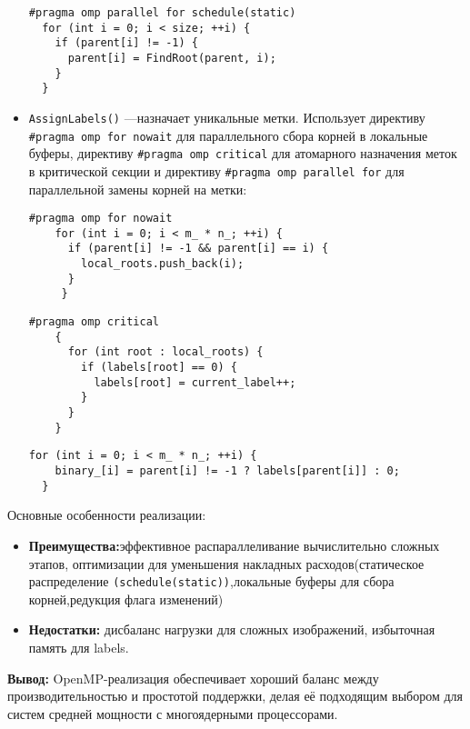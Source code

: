 \documentclass[12pt]{extarticle}
\begin{document}
\begin{itemize}
    \begin{lstlisting}[caption={Параллельное обновление родительских ссылок в методе FinalizeRoots},label={all}]
#pragma omp parallel for schedule(static)
  for (int i = 0; i < size; ++i) {
    if (parent[i] != -1) {
      parent[i] = FindRoot(parent, i);
    }
  }
  \end{lstlisting}
  \item \texttt{AssignLabels()} —назначает уникальные метки. Использует директиву \texttt{\#pragma omp for nowait} для параллельного сбора корней в локальные буферы, директиву \texttt{\#pragma omp critical} для атомарного назначения меток в критической секции и директиву \texttt{\#pragma omp parallel for} для параллельной замены корней на метки:

    \begin{lstlisting}[caption={Параллельный сбор корней в локальные буферы в методе AssignLabels},label={all}]
    #pragma omp for nowait
    for (int i = 0; i < m_ * n_; ++i) {
      if (parent[i] != -1 && parent[i] == i) {
        local_roots.push_back(i);
      }
     } 
  \end{lstlisting}
   \begin{lstlisting}[caption={Атомарное назначение меток в критической секции в методе AssignLabels},label={all}]
    #pragma omp critical
    {
      for (int root : local_roots) {
        if (labels[root] == 0) {
          labels[root] = current_label++;
        }
      }
    }
  \end{lstlisting}
  \begin{lstlisting}[caption={Параллельная замена корней на метки в методе AssignLabels},label={all}]
    for (int i = 0; i < m_ * n_; ++i) {
    binary_[i] = parent[i] != -1 ? labels[parent[i]] : 0;
  }
  \end{lstlisting}
\end{itemize}

Основные особенности реализации:
\begin{itemize}
    \item \textbf{Преимущества:}эффективное распараллеливание вычислительно сложных этапов, оптимизации для уменьшения накладных расходов(статическое распределение \texttt{(schedule(static))},локальные буферы для сбора корней,редукция флага изменений)
    \item \textbf{Недостатки:}  дисбаланс нагрузки для сложных изображений, избыточная память для labels.
\end{itemize}

\textbf{Вывод:} OpenMP-реализация обеспечивает хороший баланс между производительностью и простотой поддержки, делая её подходящим выбором для систем средней мощности с многоядерными процессорами.
\end{document}
